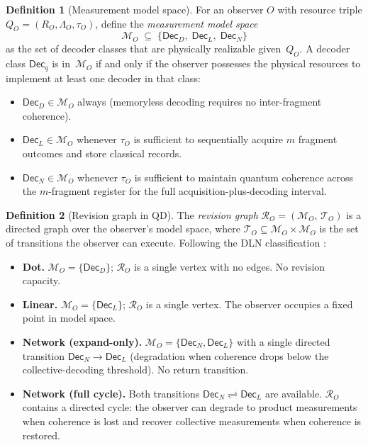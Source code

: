 \documentclass[11pt]{article}
\newcommand{\1}{\mathbf{1}}
\theoremstyle{definition}
\newtheorem{definition}{Definition}
\theoremstyle{plain}
\begin{document}
\begin{definition}[Measurement model space]
\label{def:model-space-qd}
For an observer $O$ with resource triple
$Q_O=(R_O,\Lambda_O,\tau_O)$, define the
\emph{measurement model space}
\[
  \mathcal{M}_O \;\subseteq\;
  \{\mathsf{Dec}_D,\;\mathsf{Dec}_L,\;\mathsf{Dec}_N\}
\]
as the set of decoder classes that are physically realizable
given~$Q_O$.
A decoder class $\mathsf{Dec}_q$ is in~$\mathcal{M}_O$ if and only if
the observer possesses the physical resources to implement at least one
decoder in that class:
\begin{itemize}
\item $\mathsf{Dec}_D\in\mathcal{M}_O$ always
  (memoryless decoding requires no inter-fragment coherence).
\item $\mathsf{Dec}_L\in\mathcal{M}_O$ whenever $\tau_O$ is sufficient
  to sequentially acquire $m$ fragment outcomes and store classical
  records.
\item $\mathsf{Dec}_N\in\mathcal{M}_O$ whenever $\tau_O$ is sufficient
  to maintain quantum coherence across the $m$-fragment register for
  the full acquisition-plus-decoding interval.
\end{itemize}
\end{definition}


\begin{definition}[Revision graph in QD]
\label{def:revision-qd}
The \emph{revision graph}
$\mathcal{R}_O = (\mathcal{M}_O,\,\mathcal{T}_O)$
is a directed graph over the observer's model space, where
$\mathcal{T}_O \subseteq \mathcal{M}_O\times\mathcal{M}_O$ is the set
of transitions the observer can execute.
Following the DLN classification
\citep[Sec.~2.3]{WuDLNCompression2026preprint}:
%
\begin{itemize}
\item \textbf{Dot.}
  $\mathcal{M}_O=\{\mathsf{Dec}_D\}$;
  $\mathcal{R}_O$ is a single vertex with no edges.
  No revision capacity.

\item \textbf{Linear.}
  $\mathcal{M}_O=\{\mathsf{Dec}_L\}$;
  $\mathcal{R}_O$ is a single vertex.
  The observer occupies a fixed point in model space.

\item \textbf{Network (expand-only).}
  $\mathcal{M}_O=\{\mathsf{Dec}_N,\mathsf{Dec}_L\}$ with a single
  directed transition
  $\mathsf{Dec}_N\to\mathsf{Dec}_L$
  (degradation when coherence drops below the collective-decoding
  threshold).
  No return transition.

\item \textbf{Network (full cycle).}
  Both transitions
  $\mathsf{Dec}_N \rightleftharpoons \mathsf{Dec}_L$
  are available.
  $\mathcal{R}_O$ contains a directed cycle: the observer can degrade to
  product measurements when coherence is lost and recover collective
  measurements when coherence is restored.
\end{itemize}
\end{definition}
\end{document}
